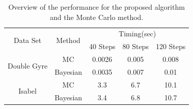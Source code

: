\begin{table}[!htb]
\centering
\begin{tabular}{|c|c|c|c|c|}
\hline
\multirow{2}{*}{Data Set}    & \multirow{2}{*}{Method}     & \multicolumn{3}{c|}{Timing(sec)}  \\ \cline{3-5}
                             &                             & 40 Steps  & 80 Steps & 120 Steps  \\ \hline
\multirow{2}{*}{Double Gyre} & MC                          & 0.0026    & 0.005    & 0.008      \\ \cline{2-5}
                             & Bayesian             & 0.0035    & 0.007    & 0.01       \\ \hline
\multirow{2}{*}{Isabel}      & MC                          & 3.3       & 6.7      & 10.1       \\ \cline{2-5}
                             & Bayesian             & 3.4       & 6.8      & 10.7       \\ \hline

\end{tabular}
\caption{Overview of the performance for the proposed algorithm and the Monte Carlo method.}
\label{timing}
\end{table}
